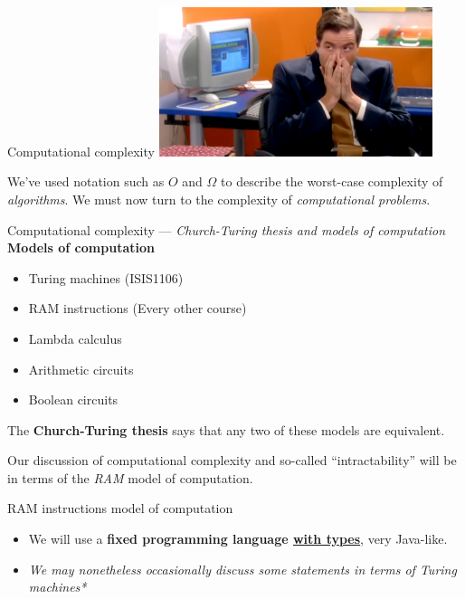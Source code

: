 


\frame{\titlepage}

\begin{frame}{Computational complexity}
	\includegraphics[width= 0.6\textwidth]{mario.png}

	\bigskip

	\pause
	We've used notation such as $O$ and $\Omega$ to describe the worst-case complexity of
	\emph{algorithms}. We must now turn to the complexity of \emph{computational problems}. 
\end{frame}

%

\begin{frame}{Computational complexity --- \emph{Church-Turing thesis and models of computation}}
	\textbf{Models of computation}
	\begin{itemize}
		\item Turing machines \checkmark (ISIS1106)
		\item RAM instructions \checkmark (Every other course)
		\item Lambda calculus
		\item Arithmetic circuits
		\item Boolean circuits
	\end{itemize}

	\bigskip

	\pause
	The \textbf{Church-Turing thesis} says that any two of these models are equivalent.

	\bigskip

	\pause
	Our discussion of computational complexity and so-called ``intractability'' will be in
	terms of the \emph{RAM} model of computation. 
\end{frame}

%

\begin{frame}{RAM instructions model of computation}
	\begin{itemize}
		\item We will use a \textbf{fixed programming language \underline{with types}},
			very Java-like.
		\item[] {\scriptsize \it *We may nonetheless occasionally discuss some statements
			in terms of Turing machines*}
	\end{itemize}
\end{frame}


